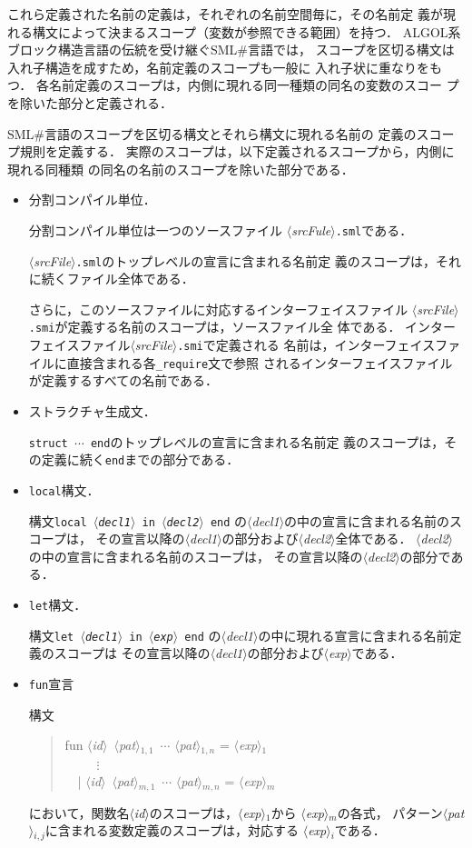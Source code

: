 \documentclass{jbook}
\newcommand{\smlsharp}{SML\#}
\newcommand{\code}[1]{\mbox{\large\tt #1}}
\newcommand{\nonterm}[1]{\mbox{$\langle$}{\it #1}\mbox{$\rangle$}}
\newenvironment{program}{\begin{quote}\begin{tt}}%
                        {\end{tt}\end{quote}}
\begin{document}
	これら定義された名前の定義は，それぞれの名前空間毎に，その名前定
義が現れる構文によって決まるスコープ（変数が参照できる範囲）を持つ．
	ALGOL系ブロック構造言語の伝統を受け継ぐ\smlsharp{}言語では，
スコープを区切る構文は入れ子構造を成すため，名前定義のスコープも一般に
入れ子状に重なりをもつ．
	各名前定義のスコープは，内側に現れる同一種類の同名の変数のスコー
プを除いた部分と定義される．
	
	\smlsharp{}言語のスコープを区切る構文とそれら構文に現れる名前の
定義のスコープ規則を定義する．
	実際のスコープは，以下定義されるスコープから，内側に現れる同種類
の同名の名前のスコープを除いた部分である．
\begin{itemize}
\item 分割コンパイル単位．

	分割コンパイル単位は一つのソースファイル
\nonterm{srcFule}{\tt .sml}である．

	\nonterm{srcFile}{\tt .sml}のトップレベルの宣言に含まれる名前定
義のスコープは，それに続くファイル全体である．

	さらに，このソースファイルに対応するインターフェイスファイル
\nonterm{srcFile}{\tt .smi}が定義する名前のスコープは，ソースファイル全
体である．
	インターフェイスファイル\nonterm{srcFile}{\tt .smi}で定義される
名前は，インターフェイスファイルに直接含まれる各\code{\_require}文で参照
されるインターフェイスファイルが定義するすべての名前である．

\item ストラクチャ生成文．

	\code{struct $\cdots$ end}のトップレベルの宣言に含まれる名前定
義のスコープは，その定義に続く\code{end}までの部分である．

\item \code{local}構文．

	構文\code{local \nonterm{decl1} in \nonterm{decl2} end}
の\nonterm{decl1}の中の宣言に含まれる名前のスコープは，
その宣言以降の\nonterm{decl1}の部分および\nonterm{decl2}全体である．
	\nonterm{decl2}の中の宣言に含まれる名前のスコープは，
その宣言以降の\nonterm{decl2}の部分である．

\item \code{let}構文．

	構文\code{let \nonterm{decl1} in \nonterm{exp} end}
の\nonterm{decl1}の中に現れる宣言に含まれる名前定義のスコープは
その宣言以降の\nonterm{decl1}の部分および\nonterm{exp}である．

\item \code{fun}宣言

構文
\begin{program}
fun \nonterm{id}\ \nonterm{pat}$_{1,1}$\ $\cdots$ \nonterm{pat}$_{1,n}$ = \nonterm{exp}$_1$\\
\ \ \ \ \ $\vdots$\\
\ \ | \nonterm{id}\ \nonterm{pat}$_{m,1}$\ $\cdots$ \nonterm{pat}$_{m,n}$ = \nonterm{exp}$_m$
\end{program}
において，関数名\nonterm{id}のスコープは，\nonterm{exp}$_1$から
\nonterm{exp}$_m$の各式，
パターン\nonterm{pat}$_{i,j}$に含まれる変数定義のスコープは，対応する
\nonterm{exp}$_i$である．


\end{itemize}
\end{document}
